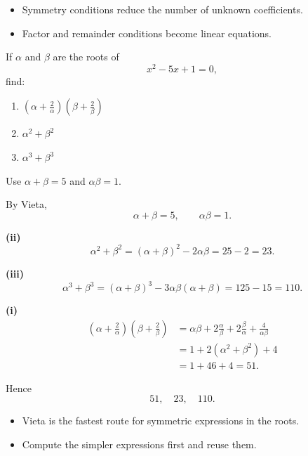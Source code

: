 \begin{takeaways}
\begin{itemize}[leftmargin=*]
\item Symmetry conditions reduce the number of unknown coefficients.
\item Factor and remainder conditions become linear equations.
\end{itemize}
\end{takeaways}

\begin{problem}
If $\alpha$ and $\beta$ are the roots of
\[
x^2-5x+1=0,
\]
find:
\begin{enumerate}[label=(\roman*)]
\item $\left(\alpha+\frac{2}{\alpha}\right)\left(\beta+\frac{2}{\beta}\right)$
\item $\alpha^2+\beta^2$
\item $\alpha^3+\beta^3$
\end{enumerate}
\end{problem}

\begin{hintbox}
Use $\alpha+\beta=5$ and $\alpha\beta=1$.
\end{hintbox}

\begin{solution}
By Vieta,
\[
\alpha+\beta=5,\qquad \alpha\beta=1.
\]

\textbf{(ii)}
\[
\alpha^2+\beta^2=(\alpha+\beta)^2-2\alpha\beta=25-2=23.
\]

\textbf{(iii)}
\[
\alpha^3+\beta^3=(\alpha+\beta)^3-3\alpha\beta(\alpha+\beta)=125-15=110.
\]

\textbf{(i)}
\begin{align*}
\left(\alpha+\frac{2}{\alpha}\right)\left(\beta+\frac{2}{\beta}\right)
&=\alpha\beta+2\frac{\alpha}{\beta}+2\frac{\beta}{\alpha}+\frac{4}{\alpha\beta}\\
&=1+2(\alpha^2+\beta^2)+4\\
&=1+46+4=51.
\end{align*}

Hence
\[
\boxed{51,\quad 23,\quad 110.}
\]
\end{solution}

\begin{takeaways}
\begin{itemize}[leftmargin=*]
\item Vieta is the fastest route for symmetric expressions in the roots.
\item Compute the simpler expressions first and reuse them.
\end{itemize}
\end{takeaways}

